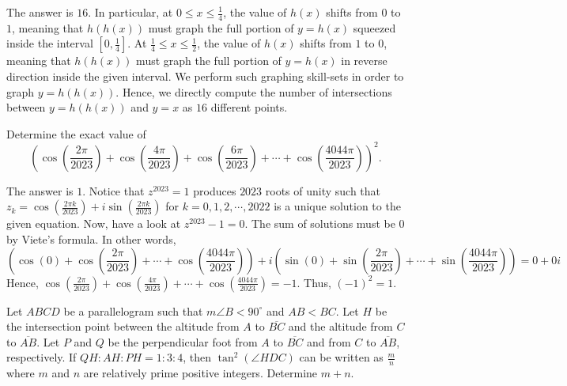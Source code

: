 \begin{solution}
The answer is $16$. In particular, at $0\leq x \leq \frac14$, the value of $h(x)$ shifts from $0$ to $1$, meaning that $h(h(x))$ must graph the full portion of $y=h(x)$ squeezed inside the interval $[0,\frac14]$. At $\frac14\leq x \leq \frac12$, the value of $h(x)$ shifts from $1$ to $0$, meaning that $h(h(x))$ must graph the full portion of $y=h(x)$ in reverse direction inside the given interval. We perform such graphing skill-sets in order to graph $y=h(h(x))$. Hence, we directly compute the number of intersections between $y=h(h(x))$ and $y=x$ as $16$ different points.
\end{solution}

\begin{problem}
Determine the exact value of \[\left(\cos(\frac{2\pi}{2023})+\cos(\frac{4\pi}{2023})+\cos(\frac{6\pi}{2023})+\cdots+\cos(\frac{4044\pi}{2023})\right)^2.\]
\end{problem}

\begin{solution}
The answer is $1$. Notice that $z^{2023}=1$ produces $2023$ roots of unity such that $z_{k}=\cos(\frac{2\pi k}{2023})+i\sin(\frac{2\pi k}{2023})$ for $k=0,1,2,\cdots,2022$ is a unique solution to the given equation. Now, have a look at $z^{2023}-1=0$. The sum of solutions must be $0$ by Viete's formula. In other words, 
$$
(\cos(0)+\cos(\frac{2\pi}{2023})+\cdots+\cos(\frac{4044\pi}{2023}))+i(\sin(0)+\sin(\frac{2\pi}{2023})+\cdots+\sin(\frac{4044\pi}{2023}))= 0+0i
$$
Hence, $\cos(\frac{2\pi}{2023})+\cos(\frac{4\pi}{2023})+\cdots+\cos(\frac{4044\pi}{2023})=-1$. Thus, $(-1)^2=1$.
\end{solution}

\begin{problem}
Let $ABCD$ be a parallelogram such that $m\angle B <90^\circ$ and $AB<BC$. Let $H$ be the intersection point between the altitude from $A$ to $\overline{BC}$ and the altitude from $C$ to $\overline{AB}$. Let $P$ and $Q$ be the perpendicular foot from $A$ to $\overline{BC}$ and from $C$ to $\overline{AB}$, respectively. If $QH:AH:PH=1:3:4$, then $\tan^2(\angle HDC)$ can be written as $\frac{m}{n}$ where $m$ and $n$ are relatively prime positive integers. Determine $m+n$.
\end{problem}

